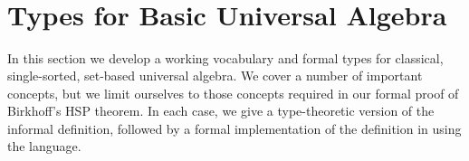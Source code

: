 \ifshort\else
\begin{code}%
\>[0]\<%
\\
\>[0]\AgdaSpace{}%
\AgdaModule{\AgdaUnderscore{}}\AgdaSpace{}%
\AgdaSymbol{\{}\AgdaSpace{}%
\AgdaSymbol{:}\AgdaSpace{}%
\AgdaSpace{}%
\AgdaSpace{}%
\AgdaSymbol{\}\{}\AgdaSpace{}%
\AgdaSymbol{:}\AgdaSpace{}%
\AgdaSpace{}%
\AgdaSpace{}%
\AgdaSymbol{\}}\AgdaSpace{}%
\<%
\\
\>[0][@{}l@{\AgdaIndent{0}}]%
\>[1]\AgdaSpace{}%
\AgdaSpace{}%
\AgdaSpace{}%
\AgdaSpace{}%
\AgdaSymbol{()}\AgdaSpace{}%
\AgdaSpace{}%
\AgdaSymbol{(}\AgdaSpace{}%
\AgdaSpace{}%
\AgdaSpace{}%
\AgdaSpace{}%
\AgdaSymbol{)}\<%
\end{code}
\fi
\begin{code}%
\>[0]\<%
\\
%
\>[1]\AgdaSpace{}%
\AgdaSymbol{:}\AgdaSpace{}%
\AgdaSymbol{(}\AgdaSpace{}%
\AgdaSpace{}%
\AgdaSymbol{)}\AgdaSpace{}%
\AgdaSpace{}%
\AgdaSpace{}%
\AgdaSymbol{(}\AgdaSpace{}%
\AgdaSpace{}%
\AgdaSymbol{)}\AgdaSpace{}%
\<%
\\
%
\>[1]\AgdaSpace{}%
\AgdaSpace{}%
\AgdaSymbol{(}\AgdaSpace{}%
\AgdaOperator{\AgdaInductiveConstructor{,}}\AgdaSpace{}%
\AgdaSymbol{)}\AgdaSpace{}%
\AgdaSymbol{=}\AgdaSpace{}%
\AgdaSpace{}%
\AgdaSpace{}%
\AgdaSpace{}%
\AgdaSpace{}%
\AgdaSpace{}%
\AgdaSpace{}%
\AgdaSpace{}%
\AgdaSpace{}%
\AgdaSpace{}%
\AgdaSpace{}%
\AgdaSpace{}%
\AgdaSpace{}%
\AgdaSymbol{(}\AgdaSpace{}%
\AgdaSpace{}%
\AgdaSymbol{)}\<%
\end{code}



\section{Types for Basic Universal Algebra}
\label{types-for-basic-universal-algebra}
In this section we develop a working vocabulary and formal types for classical,
single-sorted, set-based universal algebra.
We cover a number of important concepts, but we limit ourselves to those
concepts required in our formal proof of Birkhoff's HSP theorem.
In each case, we give a type-theoretic version of the informal definition,
followed by a formal implementation of the definition in \mltt using the \agda language.

